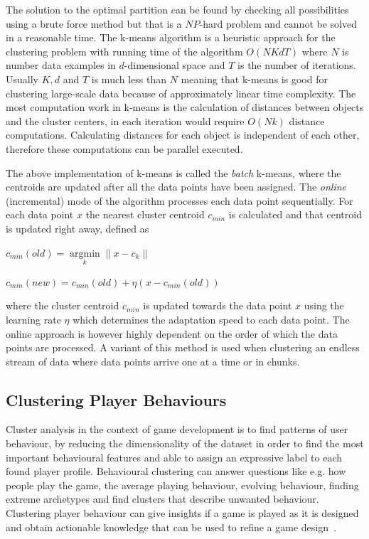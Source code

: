 The solution to the optimal partition can be found by checking all possibilities using a brute force method but that is a $NP$-hard problem \cite{Aloise:2009KmeansNPHard} and cannot be solved in a reasonable time. The k-means algorithm is a heuristic approach for the clustering problem with running time of the algorithm $O(NKdT)$ where $N$ is number data examples in $d$-dimensional space and $T$ is the number of iterations. Usually $K,d$ and $T$ is much less than $N$ meaning that k-means is good for clustering large-scale data because of approximately linear time complexity. The most computation work in k-means is the calculation of distances between objects and the cluster centers, in each iteration would require $O(Nk)$ distance computations. Calculating distances for each object is independent of each other, therefore these computations can be parallel executed.

The above implementation of k-means is called the \textit{batch} k-means, where the centroids are updated after all the data points have been assigned. The \textit{online} (incremental) mode of the algorithm processes each data point sequentially. For each data point $x$ the nearest cluster centroid $c_{min}$ is calculated and that centroid is updated right away, defined as 

\begin{center}
$c_{min}(old) = \underset{k}{\operatorname{argmin}} \|x-c_k\|$

$c_{min}(new) = c_{min}(old)+\eta(x-c_{min}(old))$
\end{center}

where the cluster centroid $c_{min}$ is updated towards the data point $x$ using the learning rate $\eta$ which determines the adaptation speed to each data point. The online approach is however highly dependent on the order of which the data points are processed. A variant of this method is used when clustering an endless stream of data where data points arrive one at a time or in chunks.


\subsection{Clustering Player Behaviours}
Cluster analysis in the context of game development is to find patterns of user behaviour, by reducing the dimensionality of the dataset in order to find the most important behavioural features and able to assign an expressive label to each found player profile. Behavioural clustering can answer questions like e.g. how people play the game, the average playing behaviour, evolving behaviour, finding extreme archetypes and find clusters that describe unwanted behaviour. Clustering player behaviour can give insights if a game is played as it is designed and obtain actionable knowledge that can be used to refine a game design~\citep{Drachen:2012}.

